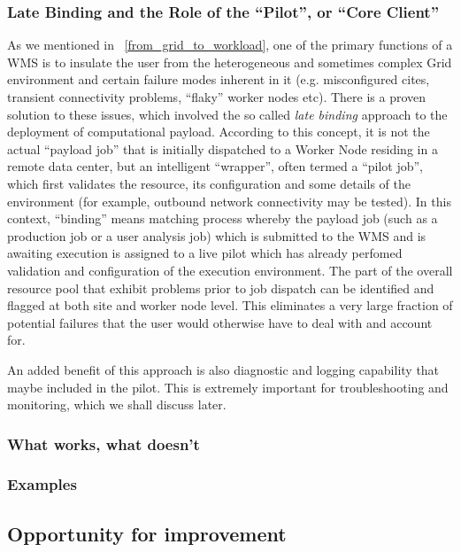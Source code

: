 \subsubsection{Late Binding and the Role of the ``Pilot'', or ``Core Client''}
As we mentioned in ~\ref{from_grid_to_workload}, one of the primary functions of a WMS is to insulate the user from the heterogeneous and sometimes complex
Grid environment and certain failure modes inherent in it (e.g. misconfigured cites, transient connectivity problems, ``flaky'' worker nodes etc).
There is a proven solution to these issues, which involved the so called \textit{late binding} approach  to the deployment of computational payload.
According to this concept, it is not the actual ``payload job'' that is initially dispatched to a  Worker Node residing in a
remote data center, but an intelligent ``wrapper'', often termed a ``pilot job'', which first validates the resource, its configuration and some details of the environment
(for example, outbound network connectivity may be tested). In this context, ``binding'' means matching process whereby the payload job (such as a production job or
a user analysis job) which is submitted to the WMS and is awaiting execution is assigned to a live pilot which has already perfomed validation and configuration of
the execution environment. The part of the overall resource pool that exhibit problems prior to job dispatch can be identified and flagged at both site and worker node
level. This eliminates a very large fraction of potential failures that the user would otherwise have to deal with and account for.

An added benefit of this approach is also diagnostic and logging capability that maybe included
in the pilot. This is extremely important for troubleshooting and monitoring, which we shall discuss later.
\subsubsection{What works, what doesn't}
\subsubsection{Examples}
\subsection{Opportunity for improvement}


